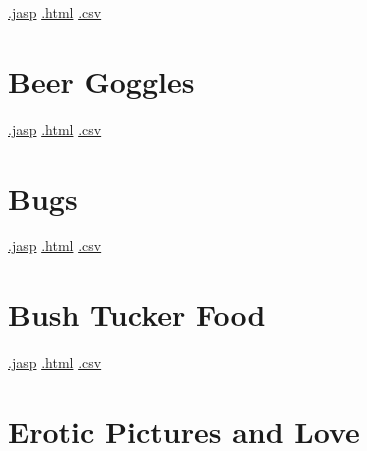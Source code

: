 \documentclass[
  letterpaper,
  DIV=11,
  numbers=noendperiod]{scrreprt}
\begin{document}
\textbar{}
\href{https://github.com/jasp-stats/jasp-data-library/raw/main/Alcohol\%20Attitudes/Alcohol\%20Attitudes.jasp}{.jasp}
\textbar{}
\href{https://htmlpreview.github.io/?https://github.com/jasp-stats/jasp-data-library/blob/main/Alcohol\%20Attitudes/index.html}{.html}
\textbar{}
\href{https://raw.githubusercontent.com/jasp-stats/jasp-data-library/main/Alcohol\%20Attitudes/Alcohol\%20Attitudes.csv}{.csv}

\hypertarget{beer-goggles}{%
\section{Beer Goggles}\label{beer-goggles}}

\textbar{}
\href{https://github.com/jasp-stats/jasp-data-library/raw/main/Beer\%20Goggles/Beer\%20Goggles.jasp}{.jasp}
\textbar{}
\href{https://htmlpreview.github.io/?https://github.com/jasp-stats/jasp-data-library/blob/main/Beer\%20Goggles/index.html}{.html}
\textbar{}
\href{https://raw.githubusercontent.com/jasp-stats/jasp-data-library/main/Beer\%20Goggles/Beer\%20Goggles.csv}{.csv}

\hypertarget{bugs}{%
\section{Bugs}\label{bugs}}

\textbar{}
\href{https://github.com/jasp-stats/jasp-data-library/raw/main/Bugs/Bugs.jasp}{.jasp}
\textbar{}
\href{https://htmlpreview.github.io/?https://github.com/jasp-stats/jasp-data-library/blob/main/Bugs/index.html}{.html}
\textbar{}
\href{https://raw.githubusercontent.com/jasp-stats/jasp-data-library/main/Bugs/Bugs.csv}{.csv}

\hypertarget{bush-tucker-food}{%
\section{Bush Tucker Food}\label{bush-tucker-food}}

\textbar{}
\href{https://github.com/jasp-stats/jasp-data-library/raw/main/Bush\%20Tucker\%20Food/Bush\%20Tucker\%20Food.jasp}{.jasp}
\textbar{}
\href{https://htmlpreview.github.io/?https://github.com/jasp-stats/jasp-data-library/blob/main/Bush\%20Tucker\%20Food/index.html}{.html}
\textbar{}
\href{https://raw.githubusercontent.com/jasp-stats/jasp-data-library/main/Bush\%20Tucker\%20Food/Bush\%20Tucker\%20Food.csv}{.csv}

\hypertarget{erotic-pictures-and-love}{%
\section{Erotic Pictures and Love}\label{erotic-pictures-and-love}}
\end{document}
